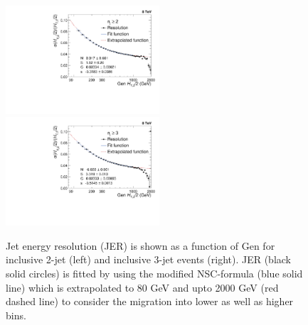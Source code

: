\begin{figure}[!h]
 \begin{center}
 \hspace*{-5mm}\includegraphics[width=0.51\textwidth]{Plots_HT_2_150/Extrapolate_Sigma_Value_Res_2_crystal_range_ext.pdf}%
 ~~\includegraphics[width=0.51\textwidth]{Plots_HT_2_150/Extrapolate_Sigma_Value_Res_3_crystal_ext.pdf}
 \caption{Jet energy resolution (JER) is shown as a function of Gen \httwo for inclusive 2-jet (left) and inclusive 3-jet events (right). JER (black solid circles) is fitted by using the modified NSC-formula (blue solid line) which is extrapolated to 80 GeV and upto 2000 GeV (red dashed line) to consider the migration into lower as well as higher bins.}
    \label{fig:resolution}
  \end{center}
\end{figure}
 
